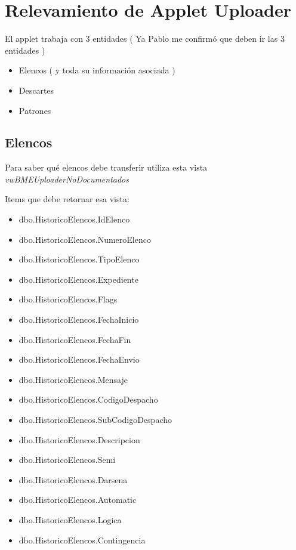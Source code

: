 \documentclass[]{article}
\title{}
\author{}
\begin{document}
\section{Relevamiento de Applet Uploader}

\par El applet trabaja con 3 entidades ( Ya Pablo me confirmó que deben ir las 3 entidades )

\begin{itemize}[label=\textcolor{blue}{\textbullet}]
	\item Elencos ( y toda su información asociada )
	\item Descartes
	\item Patrones

\end{itemize}

\newpage

\subsection{Elencos}

\par Para saber qué elencos debe transferir utiliza esta vista 
\emph{vwBMEUploaderNoDocumentados}

\par Items que debe retornar esa vista:

\begin{itemize}[label=\textcolor{blue}{\textbullet}]
	\item dbo.HistoricoElencos.IdElenco
	\item dbo.HistoricoElencos.NumeroElenco
	\item dbo.HistoricoElencos.TipoElenco
	\item dbo.HistoricoElencos.Expediente
	\item dbo.HistoricoElencos.Flags
	\item dbo.HistoricoElencos.FechaInicio
	\item dbo.HistoricoElencos.FechaFin
	\item dbo.HistoricoElencos.FechaEnvio
	\item dbo.HistoricoElencos.Mensaje
	\item dbo.HistoricoElencos.CodigoDespacho
	\item dbo.HistoricoElencos.SubCodigoDespacho
	\item dbo.HistoricoElencos.Descripcion
	\item dbo.HistoricoElencos.Semi
	\item dbo.HistoricoElencos.Darsena
	\item dbo.HistoricoElencos.Automatic
	\item dbo.HistoricoElencos.Logica
	\item dbo.HistoricoElencos.Contingencia
\end{itemize}
\end{document}
